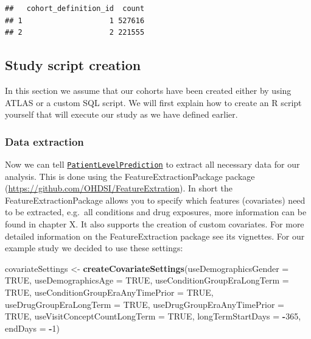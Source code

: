 \documentclass[]{book}
\newenvironment{Shaded}{\begin{snugshade}}{\end{snugshade}}
\newcommand{\KeywordTok}[1]{\textcolor[rgb]{0.13,0.29,0.53}{\textbf{#1}}}
\newcommand{\DataTypeTok}[1]{\textcolor[rgb]{0.13,0.29,0.53}{#1}}
\newcommand{\DecValTok}[1]{\textcolor[rgb]{0.00,0.00,0.81}{#1}}
\newcommand{\StringTok}[1]{\textcolor[rgb]{0.31,0.60,0.02}{#1}}
\newcommand{\OtherTok}[1]{\textcolor[rgb]{0.56,0.35,0.01}{#1}}
\newcommand{\OperatorTok}[1]{\textcolor[rgb]{0.81,0.36,0.00}{\textbf{#1}}}
\newcommand{\NormalTok}[1]{#1}
\begin{document}
\begin{verbatim}
##   cohort_definition_id  count
## 1                    1 527616
## 2                    2 221555
\end{verbatim}

\subsection{Study script creation}\label{study-script-creation}

In this section we assume that our cohorts have been created either by
using ATLAS or a custom SQL script. We will first explain how to create
an R script yourself that will execute our study as we have defined
earlier.

\subsubsection{Data extraction}\label{data-extraction}

Now we can tell
\href{http://github.com/OHDSI/PatientLevelPrediction}{\texttt{PatientLevelPrediction}}
to extract all necessary data for our analysis. This is done using the
FeatureExtractionPackage package
(\url{https://github.com/OHDSI/FeatureExtration}). In short the
FeatureExtractionPackage allows you to specify which features
(covariates) need to be extracted, e.g.~all conditions and drug
exposures, more information can be found in chapter X. It also supports
the creation of custom covariates. For more detailed information on the
FeatureExtraction package see its vignettes. For our example study we
decided to use these settings:

\begin{Shaded}
\begin{Highlighting}[]
\NormalTok{covariateSettings <-}\StringTok{ }\KeywordTok{createCovariateSettings}\NormalTok{(}\DataTypeTok{useDemographicsGender =} \OtherTok{TRUE}\NormalTok{,}
                                             \DataTypeTok{useDemographicsAge =} \OtherTok{TRUE}\NormalTok{,}
                                             \DataTypeTok{useConditionGroupEraLongTerm =} \OtherTok{TRUE}\NormalTok{,}
                                             \DataTypeTok{useConditionGroupEraAnyTimePrior =} \OtherTok{TRUE}\NormalTok{,}
                                             \DataTypeTok{useDrugGroupEraLongTerm =} \OtherTok{TRUE}\NormalTok{,}
                                             \DataTypeTok{useDrugGroupEraAnyTimePrior =} \OtherTok{TRUE}\NormalTok{,}
                                             \DataTypeTok{useVisitConceptCountLongTerm =} \OtherTok{TRUE}\NormalTok{,}
                                             \DataTypeTok{longTermStartDays =} \OperatorTok{-}\DecValTok{365}\NormalTok{,}
                                             \DataTypeTok{endDays =} \OperatorTok{-}\DecValTok{1}\NormalTok{)}
\end{Highlighting}
\end{Shaded}
\end{document}
